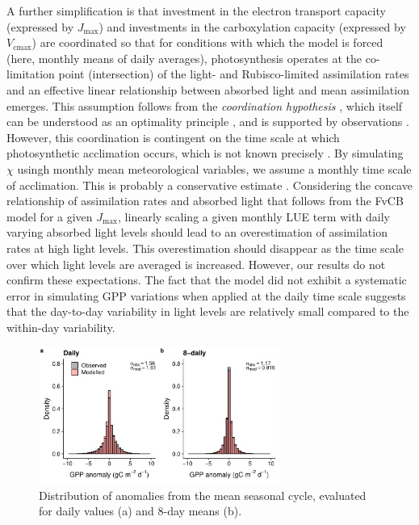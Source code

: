 \documentclass{myreport}
\newcommand{\vcmax}{$V_{\text{cmax}}$}
\newcommand{\jmax}{$J_{\text{max}}$}
\begin{document}
A further simplification is that investment in the electron transport capacity (expressed by \jmax ) and investments in the carboxylation capacity (expressed by \vcmax ) are coordinated so that for conditions with which the model is forced (here, monthly means of daily averages), photosynthesis operates at the co-limitation point (intersection) of the light- and Rubisco-limited assimilation rates and an effective linear relationship between absorbed light and mean assimilation emerges. This assumption follows from the \textit{coordination hypothesis} \citep{chen93, haxeltine96}, which itself can be understood as an optimality principle \citep{haxeltine96}, and is supported by observations \citep{maire12po}. However, this coordination is contingent on the time scale at which photosynthetic acclimation occurs, which is not known precisely  \citep{smithdukes13gcb, way14}. By simulating $\chi$ usingh monthly mean meteorological variables, we assume a monthly time scale of acclimation. This is probably a conservative estimate \citep{smithdukes17, veres84}. Considering the concave relationship of assimilation rates and absorbed light that follows from the FvCB model for a given \jmax , linearly scaling a given monthly LUE term with daily varying absorbed light levels should lead to an overestimation of assimilation rates at high light levels. This overestimation should disappear as the time scale over which light levels are averaged is increased. However, our results do not confirm these expectations. The fact that the model did not exhibit a systematic error in simulating GPP variations when applied at the daily time scale suggests that the day-to-day variability in light levels are relatively small compared to the within-day variability.

\begin{figure}[!ht]
    \centering
\includegraphics[width=0.7\textwidth]{fig/hist_anomalies.pdf}
    \caption{Distribution of anomalies from the mean seasonal cycle, evaluated for daily values (a) and 8-day means (b).} 
    \label{fig:modobs_anomalies}
\end{figure}
\end{document}
